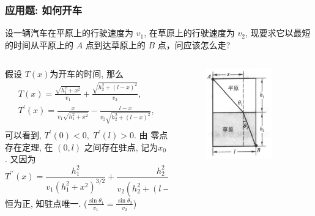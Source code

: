\documentclass[
10pt,
aspectratio=43,
]{beamer}
\begin{document}
\begin{frame}
	\frametitle{应用题: 如何开车}
	\begin{block}{}
		设一辆汽车在平原上的行驶速度为 $v_1$, 在草原上的行驶速度为 $v_2$, 现要求它以最短的时间从平原上的 $A$ 点到达草原上的 $B$ 点，问应该怎么走?
	\end{block}
	\begin{columns}
		\begin{column}{0.7\textwidth}
			假设 $T(x)$为开车的时间, 那么
			$$
				\begin{gathered}
					T(x)=\frac{\sqrt{h_1^2+x^2}}{v_1}+\frac{\sqrt{h_2^2+(l-x)^2}}{v_2},\\
					T^{\prime}(x)=\frac{x}{v_1 \sqrt{h_1^2+x^2}}-\frac{l-x}{v_2 \sqrt{h_2^2+(l-x)^2}},\\
				\end{gathered}
			$$
			可以看到, $T^{\prime}(0)<0,\,\, T^{\prime}(l)>0$. 由 零点存在定理, 在 $(0,l)$ 之间存在驻点, 记为$x_0$. 又因为
			$$
				T^{\prime \prime}(x)=\frac{h_1^2}{v_1\left(h_1^2+x^2\right)^{3 / 2}}+\frac{h_2^2}{v_2\left(h_2^2+(l-x)^2\right)^{3 / 2}}
			$$
			恒为正, 知驻点唯一. {\small($\displaystyle\frac{\sin\theta_1}{v_1}=\frac{\sin\theta_2}{v_2}$)}
		\end{column}
		\begin{column}{0.4\textwidth}
			\begin{figure}
				\includegraphics[width=0.8\textwidth]{light.png}
			\end{figure}
		\end{column}
	\end{columns}
\end{frame}
\end{document}
